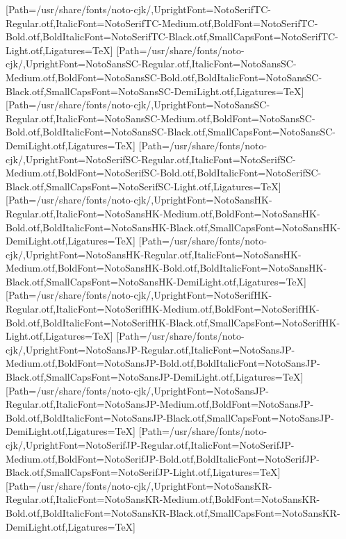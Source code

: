 \newfontfamily{}[Path=/usr/share/fonts/noto-cjk/,UprightFont=NotoSerifTC-Regular.otf,ItalicFont=NotoSerifTC-Medium.otf,BoldFont=NotoSerifTC-Bold.otf,BoldItalicFont=NotoSerifTC-Black.otf,SmallCapsFont=NotoSerifTC-Light.otf,Ligatures=TeX]
\newfontfamily{}[Path=/usr/share/fonts/noto-cjk/,UprightFont=NotoSansSC-Regular.otf,ItalicFont=NotoSansSC-Medium.otf,BoldFont=NotoSansSC-Bold.otf,BoldItalicFont=NotoSansSC-Black.otf,SmallCapsFont=NotoSansSC-DemiLight.otf,Ligatures=TeX]
\newfontfamily{}[Path=/usr/share/fonts/noto-cjk/,UprightFont=NotoSansSC-Regular.otf,ItalicFont=NotoSansSC-Medium.otf,BoldFont=NotoSansSC-Bold.otf,BoldItalicFont=NotoSansSC-Black.otf,SmallCapsFont=NotoSansSC-DemiLight.otf,Ligatures=TeX]
\newfontfamily{}[Path=/usr/share/fonts/noto-cjk/,UprightFont=NotoSerifSC-Regular.otf,ItalicFont=NotoSerifSC-Medium.otf,BoldFont=NotoSerifSC-Bold.otf,BoldItalicFont=NotoSerifSC-Black.otf,SmallCapsFont=NotoSerifSC-Light.otf,Ligatures=TeX]
\newfontfamily{}[Path=/usr/share/fonts/noto-cjk/,UprightFont=NotoSansHK-Regular.otf,ItalicFont=NotoSansHK-Medium.otf,BoldFont=NotoSansHK-Bold.otf,BoldItalicFont=NotoSansHK-Black.otf,SmallCapsFont=NotoSansHK-DemiLight.otf,Ligatures=TeX]
\newfontfamily{}[Path=/usr/share/fonts/noto-cjk/,UprightFont=NotoSansHK-Regular.otf,ItalicFont=NotoSansHK-Medium.otf,BoldFont=NotoSansHK-Bold.otf,BoldItalicFont=NotoSansHK-Black.otf,SmallCapsFont=NotoSansHK-DemiLight.otf,Ligatures=TeX]
\newfontfamily{}[Path=/usr/share/fonts/noto-cjk/,UprightFont=NotoSerifHK-Regular.otf,ItalicFont=NotoSerifHK-Medium.otf,BoldFont=NotoSerifHK-Bold.otf,BoldItalicFont=NotoSerifHK-Black.otf,SmallCapsFont=NotoSerifHK-Light.otf,Ligatures=TeX]
\newfontfamily{}[Path=/usr/share/fonts/noto-cjk/,UprightFont=NotoSansJP-Regular.otf,ItalicFont=NotoSansJP-Medium.otf,BoldFont=NotoSansJP-Bold.otf,BoldItalicFont=NotoSansJP-Black.otf,SmallCapsFont=NotoSansJP-DemiLight.otf,Ligatures=TeX]
\newfontfamily{}[Path=/usr/share/fonts/noto-cjk/,UprightFont=NotoSansJP-Regular.otf,ItalicFont=NotoSansJP-Medium.otf,BoldFont=NotoSansJP-Bold.otf,BoldItalicFont=NotoSansJP-Black.otf,SmallCapsFont=NotoSansJP-DemiLight.otf,Ligatures=TeX]
\newfontfamily{}[Path=/usr/share/fonts/noto-cjk/,UprightFont=NotoSerifJP-Regular.otf,ItalicFont=NotoSerifJP-Medium.otf,BoldFont=NotoSerifJP-Bold.otf,BoldItalicFont=NotoSerifJP-Black.otf,SmallCapsFont=NotoSerifJP-Light.otf,Ligatures=TeX]
\newfontfamily{}[Path=/usr/share/fonts/noto-cjk/,UprightFont=NotoSansKR-Regular.otf,ItalicFont=NotoSansKR-Medium.otf,BoldFont=NotoSansKR-Bold.otf,BoldItalicFont=NotoSansKR-Black.otf,SmallCapsFont=NotoSansKR-DemiLight.otf,Ligatures=TeX]
